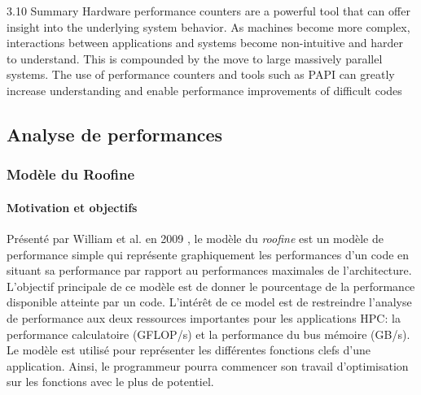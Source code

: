 3.10 Summary
    Hardware performance counters are a powerful tool that can offer insight into the underlying system behavior. As machines become more complex, interactions between applications and systems become non-intuitive and harder to understand. This is compounded by the move to large massively parallel systems. The use of performance counters and tools such as PAPI can greatly increase understanding and enable performance improvements of difficult codes

 
\subsection{Analyse de performances}%




\subsubsection{Modèle du Roofine} \label{sec:roofline}

\paragraph{Motivation et objectifs}
Présenté par William et al. en 2009 \cite{Williams2008}, le modèle du \textit{roofine} est un modèle de performance simple qui représente graphiquement les performances d’un code en situant sa performance par rapport au performances maximales de l’architecture. L’objectif principale de ce modèle est de donner le pourcentage de la performance disponible atteinte par un code. L’intérêt de ce model est de restreindre l’analyse de performance aux deux ressources importantes pour les applications HPC: la performance calculatoire (GFLOP/s) et la performance du bus mémoire (GB/s).
Le modèle est utilisé pour représenter les différentes fonctions clefs d’une application. Ainsi, le programmeur pourra commencer son travail d’optimisation sur les fonctions avec le plus de potentiel.

